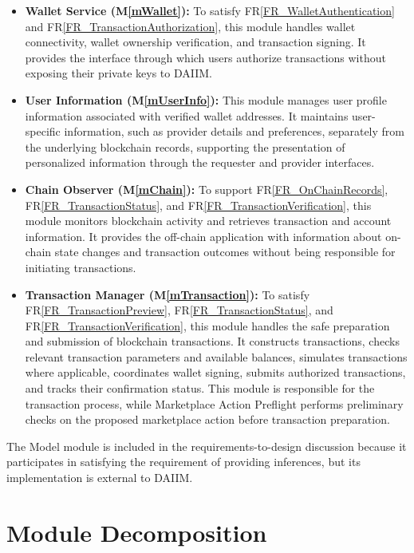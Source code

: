 \documentclass[12pt, titlepage]{article}
\newcommand{\mref}[1]{M\ref{#1}}
\newcommand{\rref}[1]{FR\ref{#1}}
\begin{document}
\begin{itemize}
    \item \textbf{Wallet Service (\mref{mWallet}):}
    To satisfy \rref{FR_WalletAuthentication} and
    \rref{FR_TransactionAuthorization}, this module handles wallet
    connectivity, wallet ownership verification, and transaction
    signing. It provides the interface through which users authorize
    transactions without exposing their private keys to DAIIM.

    \item \textbf{User Information (\mref{mUserInfo}):}
    This module manages user profile information associated with
    verified wallet addresses. It maintains user-specific information,
    such as provider details and preferences, separately from the
    underlying blockchain records, supporting the presentation of
    personalized information through the requester and provider
    interfaces.

    \item \textbf{Chain Observer (\mref{mChain}):}
    To support \rref{FR_OnChainRecords},
    \rref{FR_TransactionStatus}, and
    \rref{FR_TransactionVerification}, this module monitors blockchain
    activity and retrieves transaction and account information. It
    provides the off-chain application with information about on-chain
    state changes and transaction outcomes without being responsible
    for initiating transactions.

    \item \textbf{Transaction Manager (\mref{mTransaction}):}
    To satisfy \rref{FR_TransactionPreview},
    \rref{FR_TransactionStatus}, and
    \rref{FR_TransactionVerification}, this module handles the safe
    preparation and submission of blockchain transactions. It
    constructs transactions, checks relevant transaction parameters
    and available balances, simulates transactions where applicable,
    coordinates wallet signing, submits authorized transactions, and
    tracks their confirmation status. This module is responsible for
    the transaction process, while Marketplace Action Preflight
    performs preliminary checks on the proposed marketplace action
    before transaction preparation.

\end{itemize}

The Model module is included in the requirements-to-design discussion because
it participates in satisfying the requirement of providing inferences, but its
implementation is external to DAIIM.

\section{Module Decomposition} \label{SecMD}
\end{document}
